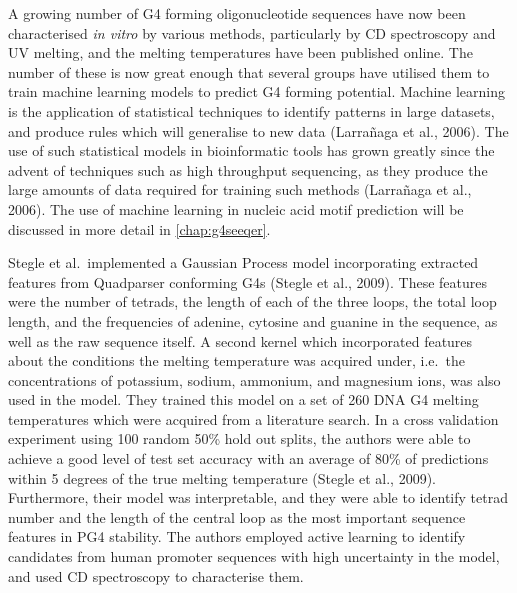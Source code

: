 \documentclass[12pt,a4paper,]{report}
\begin{document}
A growing number of G4 forming oligonucleotide sequences have now been
characterised \emph{in vitro} by various methods, particularly by CD
spectroscopy and UV melting, and the melting temperatures have been
published online. The number of these is now great enough that several
groups have utilised them to train machine learning models to predict G4
forming potential. Machine learning is the application of statistical
techniques to identify patterns in large datasets, and produce rules
which will generalise to new data (Larrañaga et al., 2006). The use of
such statistical models in bioinformatic tools has grown greatly since
the advent of techniques such as high throughput sequencing, as they
produce the large amounts of data required for training such methods
(Larrañaga et al., 2006). The use of machine learning in nucleic acid
motif prediction will be discussed in more detail in
\autoref{chap:g4seeqer}.

Stegle et al.~implemented a Gaussian Process model incorporating
extracted features from Quadparser conforming G4s (Stegle et al., 2009).
These features were the number of tetrads, the length of each of the
three loops, the total loop length, and the frequencies of adenine,
cytosine and guanine in the sequence, as well as the raw sequence
itself. A second kernel which incorporated features about the conditions
the melting temperature was acquired under, i.e.~the concentrations of
potassium, sodium, ammonium, and magnesium ions, was also used in the
model. They trained this model on a set of 260 DNA G4 melting
temperatures which were acquired from a literature search. In a cross
validation experiment using 100 random 50\% hold out splits, the authors
were able to achieve a good level of test set accuracy with an average
of 80\% of predictions within 5 degrees of the true melting temperature
(Stegle et al., 2009). Furthermore, their model was interpretable, and
they were able to identify tetrad number and the length of the central
loop as the most important sequence features in PG4 stability. The
authors employed active learning to identify candidates from human
promoter sequences with high uncertainty in the model, and used CD
spectroscopy to characterise them.
\end{document}
